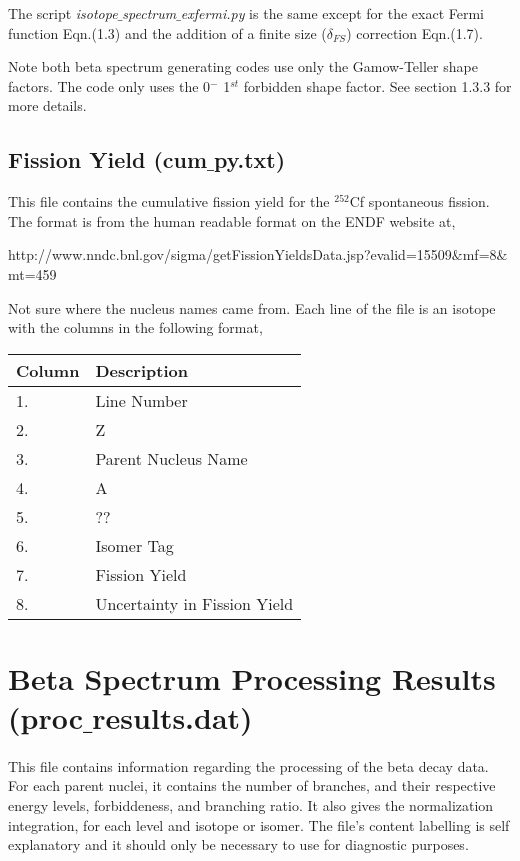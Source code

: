 \documentclass{report}
\begin{document}
The script \textit{isotope$\_$spectrum$\_$exfermi.py} is the same except for the exact Fermi function Eqn.(1.3) 
and the addition of a finite size ($\delta_{FS}$) correction Eqn.(1.7). 

Note both beta spectrum generating codes use only the Gamow-Teller shape factors. The code 
only uses the 0$^-$ 1$^{st}$ forbidden shape factor. See section 1.3.3 for more details.

\subsection{Fission Yield (cum$\_$py.txt)}
This file contains the cumulative fission yield for the $^{252}$Cf spontaneous fission. The format is from the 
human readable format on the ENDF website at, 
\begin{center}
 http://www.nndc.bnl.gov/sigma/getFissionYieldsData.jsp?evalid=15509$\&$mf=8$\&$mt=459 
 \end{center}
 Not sure where the nucleus names came from. Each line of the file is an isotope with the columns 
 in the following format,
 
 \begin{table}[H]
\centering
\renewcommand{\arraystretch}{1.75}
  \begin{tabular}{ll}
    \toprule 
     Column & Description\\
       \midrule
  	 1. &Line Number\\
	  2.&Z \\
	   3.& Parent Nucleus Name\\
	    4.& A \\
	    5. & ?? \\
	     6.& Isomer Tag \\ 
	      7.& Fission Yield  \\
	       8.& Uncertainty in Fission Yield \\
    	   \bottomrule
  \end{tabular}
\end{table}
\section{Beta Spectrum Processing Results (proc$\_$results.dat)}
\paragraph{} 
This file contains information regarding the processing of the beta decay data. For each parent 
nuclei, it contains the number of branches, and their respective energy levels, forbiddeness, and 
branching ratio. It also gives the normalization integration, for each level and isotope or isomer. The 
file's content labelling is self explanatory and it should only be necessary to use for diagnostic purposes. 
\end{document}
